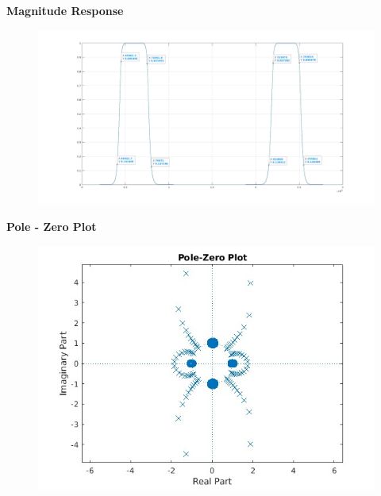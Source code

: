 \documentclass{article}
\begin{document}
\textbf{Magnitude Response}

\begin{figure}[H]
\begin{adjustwidth}{-1cm}{}
\hspace*{-2.5cm}
    \centering
    \includegraphics[scale = 0.3]{Final_TF.jpg}
    \label{fig:my_label}
    \end{adjustwidth}
\end{figure}

\textbf{Pole - Zero Plot}
\begin{figure}[H]
\hspace*{-2.5cm}
    \centering
    \includegraphics[scale = 0.6]{polezero_final.jpg}
    \label{fig:my_label}
\end{figure}
\end{document}

